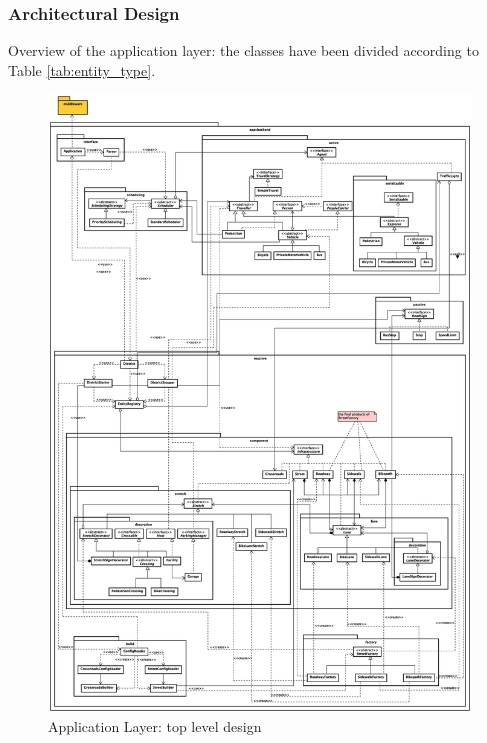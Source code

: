 \subsubsection{Architectural Design}
Overview of the application layer: the classes have been divided according to
Table \ref{tab:entity_type}.

\begin{figure}[H]
  \centering
  \includegraphics[width=.95\columnwidth]{images/solution/app/backend/app_backend_architecture.eps}
  \caption{Application Layer: top level design}
  \label{fig:sd-app-backend-architecture}
\end{figure}

